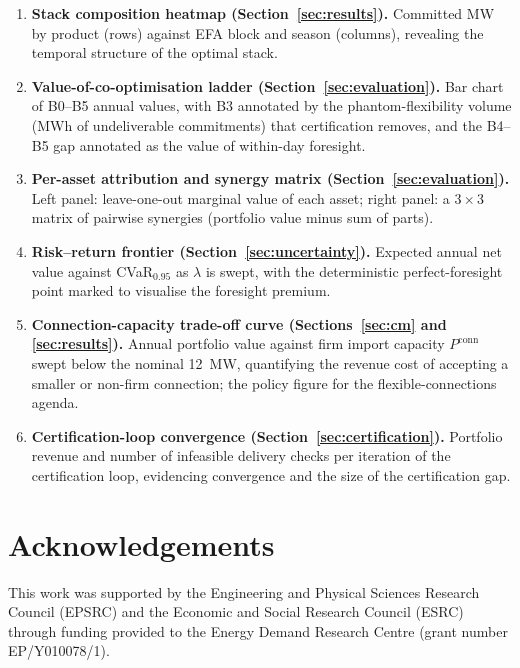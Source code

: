 \documentclass[lettersize,journal]{IEEEtran}
\begin{document}
\begin{enumerate}
    \item \textbf{Stack composition heatmap (Section~\ref{sec:results}).} Committed MW by product (rows) against EFA block and season (columns), revealing the temporal structure of the optimal stack.
    \item \textbf{Value-of-co-optimisation ladder (Section~\ref{sec:evaluation}).} Bar chart of B0--B5 annual values, with B3 annotated by the phantom-flexibility volume (MWh of undeliverable commitments) that certification removes, and the B4--B5 gap annotated as the value of within-day foresight.
    \item \textbf{Per-asset attribution and synergy matrix (Section~\ref{sec:evaluation}).} Left panel: leave-one-out marginal value of each asset; right panel: a $3\times3$ matrix of pairwise synergies (portfolio value minus sum of parts).
    \item \textbf{Risk--return frontier (Section~\ref{sec:uncertainty}).} Expected annual net value against CVaR$_{0.95}$ as $\lambda$ is swept, with the deterministic perfect-foresight point marked to visualise the foresight premium.
    \item \textbf{Connection-capacity trade-off curve (Sections~\ref{sec:cm} and \ref{sec:results}).} Annual portfolio value against firm import capacity $P^{\mathrm{conn}}$ swept below the nominal 12~MW, quantifying the revenue cost of accepting a smaller or non-firm connection; the policy figure for the flexible-connections agenda.
    \item \textbf{Certification-loop convergence (Section~\ref{sec:certification}).} Portfolio revenue and number of infeasible delivery checks per iteration of the certification loop, evidencing convergence and the size of the certification gap.
\end{enumerate}




\section*{Acknowledgements}

This work was supported by the Engineering and Physical Sciences Research Council (EPSRC) and the Economic and Social Research Council (ESRC) through funding provided to the Energy Demand Research Centre (grant number EP/Y010078/1).
\end{document}
